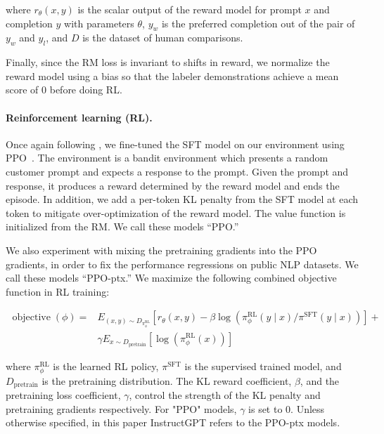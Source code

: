 where \( r_{\theta}(x, y) \) is the scalar output of the reward model for prompt \( x \) and completion \( y \) with parameters \( \theta \), \(y_{w}\) is the preferred completion out of the pair of \(y_{w}\) and \(y_{l}\), and $D$ is the dataset of human comparisons.

Finally, since the RM loss is invariant to shifts in reward, we normalize the reward model using a bias so that the labeler demonstrations achieve a mean score of 0 before doing RL.

\paragraph{Reinforcement learning (RL).} Once again following \citet{stiennon2020learning}, we fine-tuned the SFT model on our environment using PPO~\citep{schulman2017proximal}. The environment is a bandit environment which presents a random customer prompt and expects a response to the prompt.  Given the prompt and response, it produces a reward determined by the reward model and ends the episode.  In addition, we add a per-token KL penalty from the SFT model at each token to mitigate over-optimization of the reward model.  The value function is initialized from the RM. We call these models ``PPO.''

We also experiment with mixing the pretraining gradients into the PPO gradients, in order to fix the performance regressions on public NLP datasets. We call these models ``PPO-ptx.''  We maximize the following combined objective function in RL training:

\begin{equation} \label{eq2}
\begin{split}
\operatorname{objective}\left(\phi\right)= & E_{\left(x, y\right) \sim D_{\pi_{\phi}^{\mathrm{RL}}}}\left[r_{\theta}(x, y)-\beta \log \left(\pi_{\phi}^{\mathrm{RL}}(y \mid x) / \pi^{\mathrm{SFT}}(y \mid x)\right)\right] + \\
 & \gamma E_{x \sim D_\textrm{pretrain}}\left[\log(\pi_{\phi}^{\mathrm{RL}}(x))\right]
\end{split}
\end{equation}

where \( \pi_{\phi}^{\mathrm{RL}}\) is the learned RL policy, \( \pi^{\mathrm{SFT}}\) is the supervised trained model, and \(D_\textrm{pretrain} \) is the pretraining distribution. The KL reward coefficient, \( \beta \), and the pretraining loss coefficient, \( \gamma \), control the strength of the KL penalty and pretraining gradients respectively. For "PPO" models, \( \gamma \) is set to 0. Unless otherwise specified, in this paper InstructGPT refers to the PPO-ptx models.


